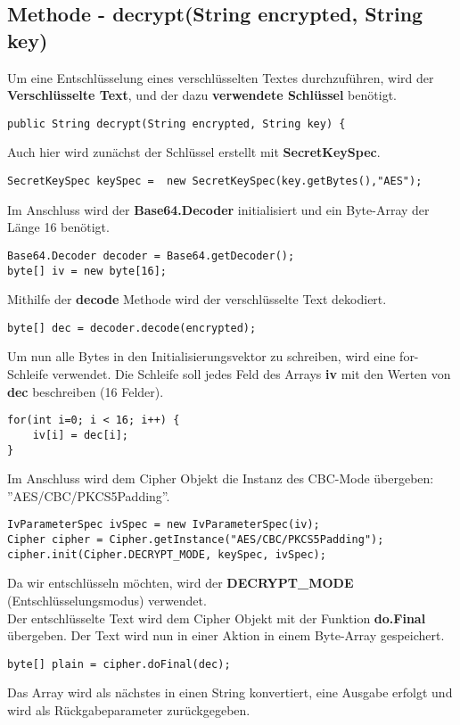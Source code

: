 \documentclass[12pt]{article}
\begin{document}
\subsection{Methode - decrypt(String encrypted, String key)}
Um eine Entschlüsselung eines verschlüsselten Textes durchzuführen, wird der \textbf{Verschlüsselte Text}, und der dazu \textbf{verwendete Schlüssel} benötigt.
\begin{lstlisting}
public String decrypt(String encrypted, String key) {
\end{lstlisting}
Auch hier wird zunächst der Schlüssel erstellt mit \textbf{SecretKeySpec}.
\begin{lstlisting}
SecretKeySpec keySpec =  new SecretKeySpec(key.getBytes(),"AES");
\end{lstlisting}
Im Anschluss wird der \textbf{Base64.Decoder} initialisiert und ein Byte-Array der Länge 16 benötigt.
\begin{lstlisting}
Base64.Decoder decoder = Base64.getDecoder();
byte[] iv = new byte[16];
\end{lstlisting}
Mithilfe der \textbf{decode} Methode wird der verschlüsselte Text dekodiert.
\begin{lstlisting}
byte[] dec = decoder.decode(encrypted);
\end{lstlisting}
Um nun alle Bytes in den Initialisierungsvektor zu schreiben, wird eine for-Schleife verwendet. Die Schleife soll jedes Feld des Arrays \textbf{iv} mit den Werten von \textbf{dec} beschreiben (16 Felder).
\begin{lstlisting}
for(int i=0; i < 16; i++) {	
	iv[i] = dec[i];
}
\end{lstlisting}
Im Anschluss wird dem Cipher Objekt die Instanz des CBC-Mode übergeben: ”AES/CBC/PKCS5Padding”.
\begin{lstlisting}
IvParameterSpec ivSpec = new IvParameterSpec(iv);
Cipher cipher = Cipher.getInstance("AES/CBC/PKCS5Padding");
cipher.init(Cipher.DECRYPT_MODE, keySpec, ivSpec);
\end{lstlisting}
Da wir entschlüsseln möchten, wird der \textbf{DECRYPT\_MODE} (Entschlüsselungsmodus) verwendet. \\
Der entschlüsselte Text wird dem Cipher Objekt mit der Funktion \textbf{do.Final} übergeben. Der Text wird nun in einer Aktion in einem Byte-Array gespeichert. 
\begin{lstlisting}
byte[] plain = cipher.doFinal(dec);
\end{lstlisting}
Das Array wird als nächstes in einen String konvertiert, eine Ausgabe erfolgt und wird als Rückgabeparameter zurückgegeben.
\end{document}
